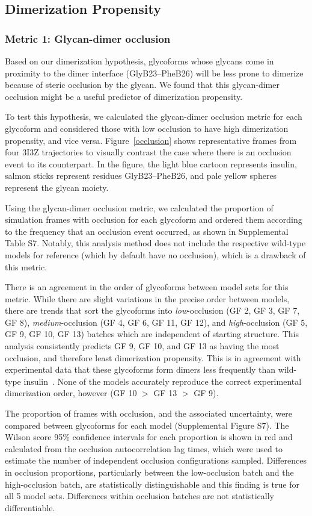 \documentclass[sn-vancouver]{sn-jnl}
\begin{document}
\subsection{Dimerization Propensity}
\subsubsection*{Metric 1: Glycan-dimer occlusion}
Based on our dimerization hypothesis, glycoforms whose glycans come in proximity to the dimer interface (GlyB23--PheB26) will be less prone to dimerize because of steric occlusion by the glycan. We found that this glycan-dimer occlusion might be a useful predictor of dimerization propensity. 

To test this hypothesis, we calculated the glycan-dimer occlusion metric for each glycoform and considered those with low occlusion to have high dimerization propensity, and vice versa. Figure~\ref{occlusion} shows representative frames from four 3I3Z trajectories to visually contrast the case where there is an occlusion event to its counterpart. In the figure, the light blue cartoon represents insulin, salmon sticks represent residues GlyB23--PheB26, and pale yellow spheres represent the glycan moiety. 

Using the glycan-dimer occlusion metric, we calculated the proportion of simulation frames with occlusion for each glycoform and ordered them according to the frequency that an occlusion event occurred, as shown in Supplemental Table S7. Notably, this analysis method does not include the respective wild-type models for reference (which by default have no occlusion), which is a drawback of this metric.

There is an agreement in the order of glycoforms between model sets for this metric. While there are slight variations in the precise order between models, there are trends that sort the glycoforms into \emph{low}-occlusion (GF 2, GF 3, GF 7, GF 8), \emph{medium}-occlusion (GF 4, GF 6, GF 11, GF 12), and \emph{high}-occlusion (GF 5, GF 9, GF 10, GF 13) batches which are independent of starting structure. This analysis consistently predicts GF 9, GF 10, and GF 13 as having the most occlusion, and therefore least dimerization propensity. This is in agreement with experimental data that these glycoforms form dimers less frequently than wild-type insulin~\cite{guan2018chemically}. None of the models accurately reproduce the correct experimental dimerization order, however (GF 10 $>$ GF 13 $>$ GF 9).

The proportion of frames with occlusion, and the associated uncertainty, were compared between glycoforms for each model (Supplemental Figure S7). The Wilson score 95\% confidence intervals for each proportion is shown in red and calculated from the occlusion autocorrelation lag times, which were used to estimate the number of independent occlusion configurations sampled. Differences in occlusion proportions, particularly between the low-occlusion batch and the high-occlusion batch, are statistically distinguishable and this finding is true for all 5 model sets. Differences within occlusion batches are not statistically differentiable.
\end{document}
